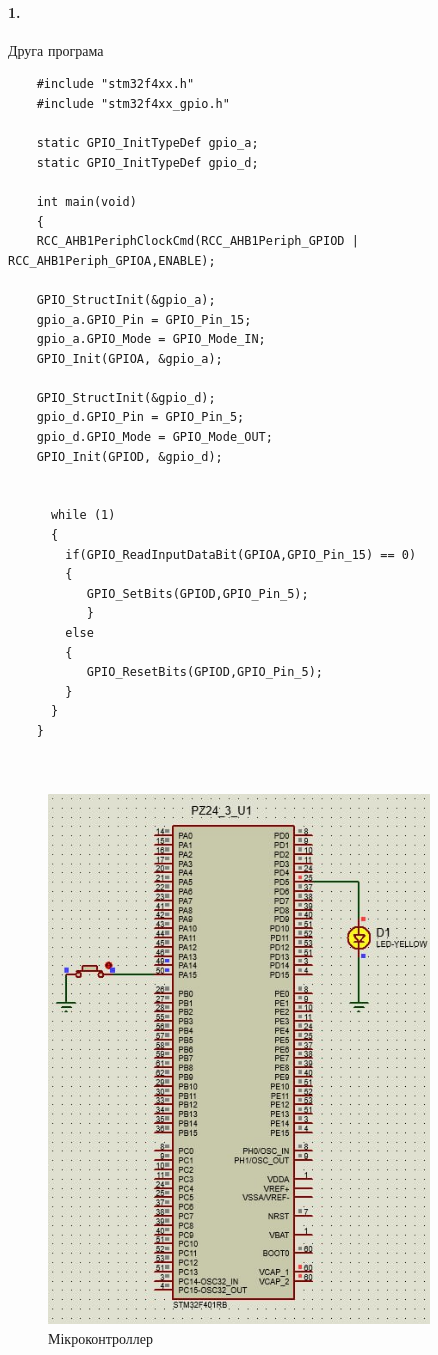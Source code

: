 \documentclass[12pt]{extarticle}
\begin{document}
\break
\paragraph{1.}Друга програма
\begin{verbatim}
    #include "stm32f4xx.h"   
    #include "stm32f4xx_gpio.h" 
    
    static GPIO_InitTypeDef gpio_a; 
    static GPIO_InitTypeDef gpio_d;
    
    int main(void) 
    {
    RCC_AHB1PeriphClockCmd(RCC_AHB1Periph_GPIOD | RCC_AHB1Periph_GPIOA,ENABLE);
     
    GPIO_StructInit(&gpio_a); 
    gpio_a.GPIO_Pin = GPIO_Pin_15; 
    gpio_a.GPIO_Mode = GPIO_Mode_IN;   
    GPIO_Init(GPIOA, &gpio_a);  	
        
    GPIO_StructInit(&gpio_d); 
    gpio_d.GPIO_Pin = GPIO_Pin_5; 
    gpio_d.GPIO_Mode = GPIO_Mode_OUT;   
    GPIO_Init(GPIOD, &gpio_d); 
        
     
      while (1) 
      {
        if(GPIO_ReadInputDataBit(GPIOA,GPIO_Pin_15) == 0)
        {
           GPIO_SetBits(GPIOD,GPIO_Pin_5);
           }
        else
        {
           GPIO_ResetBits(GPIOD,GPIO_Pin_5);
        }
      }
    }
    
    
\end{verbatim}
\begin{figure}[H]
    \centering
    \includegraphics[width=0.90\textwidth]{smt32.jpg}
    \caption{Мікроконтроллер}
\end{figure}
\end{document}
